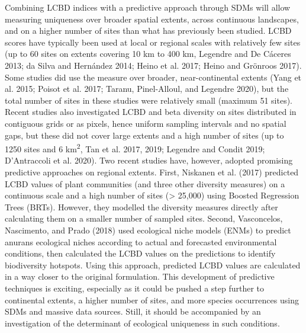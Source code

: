 \documentclass[11pt]{article}
\begin{document}
Combining LCBD indices with a predictive approach through SDMs will
allow measuring uniqueness over broader spatial extents, across
continuous landscapes, and on a higher number of sites than what has
previously been studied. LCBD scores have typically been used at local
or regional scales with relatively few sites (up to 60 sites on extents
covering 10 km to 400 km, Legendre and De Cáceres 2013; da Silva and
Hernández 2014; Heino et al. 2017; Heino and Grönroos 2017). Some
studies did use the measure over broader, near-continental extents (Yang
et al. 2015; Poisot et al. 2017; Taranu, Pinel-Alloul, and Legendre
2020), but the total number of sites in these studies were relatively
small (maximum 51 sites). Recent studies also investigated LCBD and beta
diversity on sites distributed in contiguous grids or as pixels, hence
uniform sampling intervals and no spatial gaps, but these did not cover
large extents and a high number of sites (up to 1250 sites and 6
km\textsuperscript{2}, Tan et al. 2017, 2019; Legendre and Condit 2019;
D'Antraccoli et al. 2020). Two recent studies have, however, adopted
promising predictive approaches on regional extents. First, Niskanen et
al. (2017) predicted LCBD values of plant communities (and three other
diversity measures) on a continuous scale and a high number of sites
(\textgreater{} 25,000) using Boosted Regression Trees (BRTs). However,
they modelled the diversity measures directly after calculating them on
a smaller number of sampled sites. Second, Vasconcelos, Nascimento, and
Prado (2018) used ecological niche models (ENMs) to predict anurans
ecological niches according to actual and forecasted environmental
conditions, then calculated the LCBD values on the predictions to
identify biodiversity hotspots. Using this approach, predicted LCBD
values are calculated in a way closer to the original formulation. This
development of predictive techniques is exciting, especially as it could
be pushed a step further to continental extents, a higher number of
sites, and more species occurrences using SDMs and massive data sources.
Still, it should be accompanied by an investigation of the determinant
of ecological uniqueness in such conditions.
\end{document}
